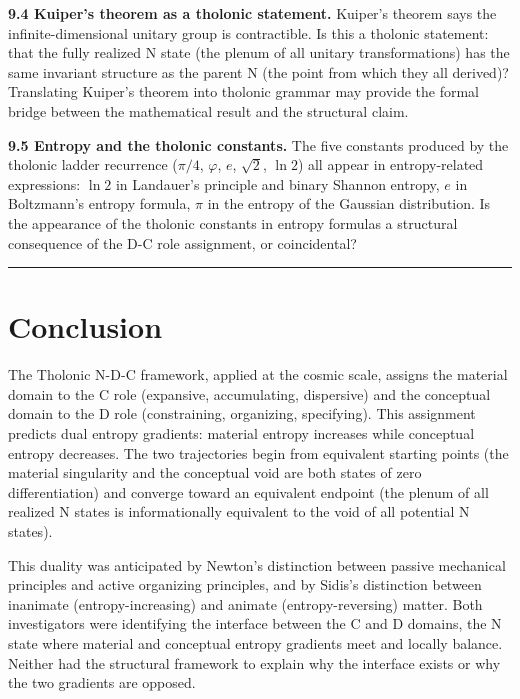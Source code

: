 \documentclass[12pt]{article}
\begin{document}
\textbf{9.4 Kuiper's theorem as a tholonic statement.} Kuiper's theorem
says the infinite-dimensional unitary group is contractible. Is this a
tholonic statement: that the fully realized N state (the plenum of all
unitary transformations) has the same invariant structure as the parent
N (the point from which they all derived)? Translating Kuiper's theorem
into tholonic grammar may provide the formal bridge between the
mathematical result and the structural claim.

\textbf{9.5 Entropy and the tholonic constants.} The five constants
produced by the tholonic ladder recurrence (\(\pi/4\), \(\varphi\),
\(e\), \(\sqrt{2}\), \(\ln 2\)) all appear in entropy-related
expressions: \(\ln 2\) in Landauer's principle and binary Shannon
entropy, \(e\) in Boltzmann's entropy formula, \(\pi\) in the entropy of
the Gaussian distribution. Is the appearance of the tholonic constants
in entropy formulas a structural consequence of the D-C role assignment,
or coincidental?

\begin{center}\rule{0.5\linewidth}{0.5pt}\end{center}

\section{Conclusion}\label{conclusion}

The Tholonic N-D-C framework, applied at the cosmic scale, assigns the
material domain to the C role (expansive, accumulating, dispersive) and
the conceptual domain to the D role (constraining, organizing,
specifying). This assignment predicts dual entropy gradients: material
entropy increases while conceptual entropy decreases. The two
trajectories begin from equivalent starting points (the material
singularity and the conceptual void are both states of zero
differentiation) and converge toward an equivalent endpoint (the plenum
of all realized N states is informationally equivalent to the void of
all potential N states).

This duality was anticipated by Newton's distinction between passive
mechanical principles and active organizing principles, and by Sidis's
distinction between inanimate (entropy-increasing) and animate
(entropy-reversing) matter. Both investigators were identifying the
interface between the C and D domains, the N state where material and
conceptual entropy gradients meet and locally balance. Neither had the
structural framework to explain why the interface exists or why the two
gradients are opposed.
\end{document}
